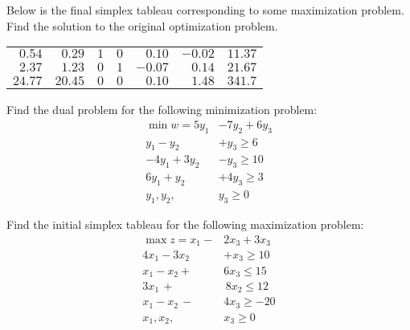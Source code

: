 \documentclass[12pt,letterpaper]{exam}
\begin{document}
\begin{questions}
\newpage
\question[10] Below is the final simplex tableau corresponding to some maximization problem. Find the solution to the original optimization problem. \par
	\begin{table}[!ht]
	\centering
	\begin{tabular}{rrrrrrr}
	$0.54$ & $0.29$ & $1$ & $0$ & $0.10$ & $-0.02$ & $11.37$ \\
	$2.37$ & $1.23$ & $0$ & $1$ & $-0.07$ & $0.14$ & $21.67$ \\
	$24.77$ & $20.45$ & $0$ & $0$& $0.10$ & $1.48$ & $341.7$
	\end{tabular}
	\end{table}



\newpage
\question[10] Find the dual problem for the following minimization problem:
	\[
	\begin{aligned}
	\min w= 5y_1 &- 7y_2 + 6y_3 \\
	y_1 - y_2 &+ y_3 \geq 6 \\
	-4y_1 + 3y_2 &- y_3 \geq 10 \\
	6y_1 + y_2 &+ 4y_3 \geq 3 \\
	y_1, y_2, \,&y_3 \geq 0
	\end{aligned}
	\]



\newpage
\question[10] Find the initial simplex tableau for the following maximization problem:
	\[
	\begin{aligned}
	\max z= x_1 - &2x_3 + 3x_3 \\
	4x_1 - 3x_2 &+ x_3 \geq 10 \\
	x_1 - x_2 + &6x_3 \leq 15 \\
	3x_1 \,+ &\,8x_2 \leq 12 \\
	x_1 - x_2 \,-\, &4x_3 \geq -20 \\
	x_1, x_2, \,&x_3 \geq 0 
	\end{aligned}
	\]
	















\end{questions}
\end{document}
